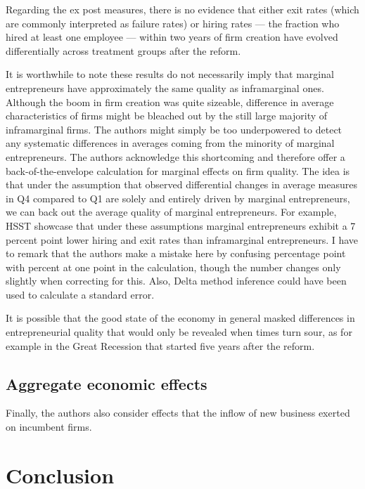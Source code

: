 Regarding the ex post measures, there is no evidence that either exit rates (which are commonly interpreted as failure rates) or hiring rates --- the fraction who hired at least one employee --- within two years of firm creation have evolved differentially across treatment groups after the reform. 

\noindent It is worthwhile to note these results do not necessarily imply that marginal entrepreneurs have approximately the same quality as inframarginal ones. Although the boom in firm creation was quite sizeable, difference in average characteristics of firms might be bleached out by the still large majority of inframarginal firms. The authors might simply be too underpowered to detect any systematic differences in averages coming from the minority of marginal entrepreneurs.
The authors acknowledge this shortcoming and therefore offer a back-of-the-envelope calculation for marginal effects on firm quality. The idea is that under the assumption that observed differential changes in average measures in Q4 compared to Q1 are solely and entirely driven by marginal entrepreneurs, we can back out the average quality of marginal entrepreneurs. For example, HSST showcase that under these assumptions marginal entrepreneurs exhibit a 7 percent point lower hiring and exit rates than inframarginal entrepreneurs. I have to remark that the authors make a mistake here by confusing percentage point with percent at one point in the calculation, though the number changes only slightly when correcting for this. Also, Delta method inference could have been used to calculate a standard error.

It is possible that the good state of the economy in general masked differences in entrepreneurial quality that would only be revealed when times turn sour, as for example in the Great Recession that started five years after the reform.


\subsection{Aggregate economic effects}

Finally, the authors also consider effects that the inflow of new business exerted on incumbent firms. 


\section{Conclusion}
